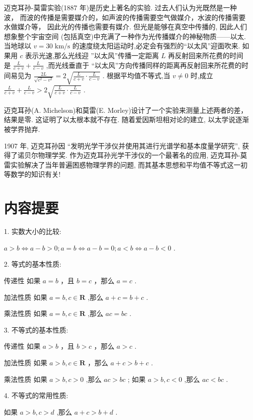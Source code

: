 \documentclass[10pt]{article}
\begin{document}
迈克耳孙-莫雷实验(1887 年)是历史上著名的实验. 过去人们认为光既然是一种波， 而波的传播是需要媒介的，如声波的传播需要空气做媒介，水波的传播需要水做媒介等， 因此光的传播也需要有媒介. 但光是能够在真空中传播的, 因此人们想象整个宇宙空间 (包括真空)中充满了一种作为光传播媒介的神秘物质——以太. 当地球以 \(v = {30}\mathrm{\;{km}}/\mathrm{s}\) 的速度绕太阳运动时,必定会有强烈的“以太风”迎面吹来. 如果用 \(c\) 表示光速,那么光线迎 ”以太风”传播一定距离 \(L\) 再反射回来所花费的时间是 \(\frac{L}{c + v} + \frac{L}{c - v}\) ,而光线垂直于 “以太风”方向传播同样的距离再反射回来所花费的时间易见为 \(\frac{2L}{\sqrt{{c}^{2} - {v}^{2}}} = 2\sqrt{\frac{L}{c + v} \cdot  \frac{L}{c - v}}\) . 根据平均值不等式,当 \(v \neq  0\) 时,成立 \(\frac{L}{c + v} + \frac{L}{c - v} > 2\sqrt{\frac{L}{c + v} \cdot  \frac{L}{c - v}}\) .

迈克耳孙(A. Michelson)和莫雷(E. Morley)设计了一个实验来测量上述两者的差，结果是零. 这证明了以太根本就不存在. 随着爱因斯坦相对论的建立, 以太学说逐渐被学界抛弃.

1907 年, 迈克耳孙因 “发明光学干涉仪并使用其进行光谱学和基本度量学研究”, 获得了诺贝尔物理学奖. 作为迈克耳孙光学干涉仪的一个最著名的应用, 迈克耳孙-莫雷实验解决了当年普遍困惑物理学界的问题, 而其基本思想和平均值不等式这一初等数学的知识有关!

\section*{内容提要}

1. 实数大小的比较:

\(a > b \Leftrightarrow  a - b > 0;a = b \Leftrightarrow  a - b = 0;a < b \Leftrightarrow  a - b < 0\) .

2. 等式的基本性质:

传递性 如果 \(a = b\) ，且 \(b = c\) ，那么 \(a = c\) .

加法性质 如果 \(a = b,c \in  \mathbf{R}\) ,那么 \(a + c = b + c\) .

乘法性质 如果 \(a = b,c \in  \mathbf{R}\) ,那么 \({ac} = {bc}\) .

3. 不等式的基本性质:

传递性 如果 \(a > b\) ，且 \(b > c\) ，那么 \(a > c\) .

加法性质 如果 \(a > b,c \in  \mathbf{R}\) ，那么 \(a + c > b + c\) .

乘法性质 如果 \(a > b,c > 0\) ,那么 \({ac} > {bc}\) ; 如果 \(a > b,c < 0\) ,那么 \({ac} < {bc}\) .

4. 不等式的常用性质:

如果 \(a > b,c > d\) ,那么 \(a + c > b + d\) .
\end{document}
